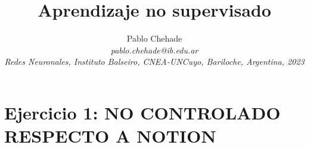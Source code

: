 \documentclass[aps,prb,twocolumn,superscriptaddress,floatfix,longbibliography]{revtex4-2}
\begin{document}
\newcommand{\mytitle}{Aprendizaje no supervisado}

\title{\mytitle}

\author{Pablo Chehade \\
    \small \textit{pablo.chehade@ib.edu.ar} \\
    \small \textit{Redes Neuronales, Instituto Balseiro, CNEA-UNCuyo, Bariloche, Argentina, 2023} \\}
    
\maketitle




\section*{Ejercicio 1: NO CONTROLADO RESPECTO A NOTION}
\end{document}
